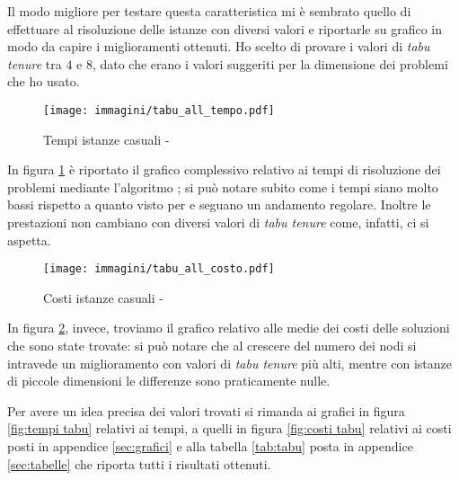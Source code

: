 Il modo migliore per testare questa caratteristica mi è sembrato quello di effettuare al risoluzione delle istanze con diversi valori e riportarle su grafico in modo da capire i miglioramenti ottenuti.
Ho scelto di provare i valori di \emph{tabu tenure} tra $4$ e $8$, dato che erano i valori suggeriti per la dimensione dei problemi che ho usato.

\begin{figure}[htb]
	\centering
	\texttt{[image: immagini/tabu\_all\_tempo.pdf]}
	\caption{Tempi istanze casuali - \tabu}
	\label{fig:all tempi tabu}
\end{figure}

In figura \ref{fig:all tempi tabu} è riportato il grafico complessivo relativo ai tempi di risoluzione dei problemi mediante l'algoritmo \tabu; si può notare subito come i tempi siano molto bassi rispetto a quanto visto per  e seguano un andamento regolare.
Inoltre le prestazioni non cambiano con diversi valori di \emph{tabu tenure} come, infatti, ci si aspetta.

\begin{figure}[htb]
	\centering
	\texttt{[image: immagini/tabu\_all\_costo.pdf]}
	\caption{Costi istanze casuali - \tabu}
	\label{fig:all costi tabu}
\end{figure}

In figura \ref{fig:all costi tabu}, invece, troviamo il grafico relativo alle medie dei costi delle soluzioni che sono state trovate: si può notare che al crescere del numero dei nodi si intravede un miglioramento con valori di \emph{tabu tenure} più alti, mentre con istanze di piccole dimensioni le differenze sono praticamente nulle.

Per avere un idea precisa dei valori trovati si rimanda ai grafici in figura \ref{fig:tempi tabu} relativi ai tempi, a quelli in figura \ref{fig:costi tabu} relativi ai costi posti in appendice \ref{sec:grafici} e alla tabella \ref{tab:tabu} posta in appendice \ref{sec:tabelle} che riporta tutti i risultati ottenuti.